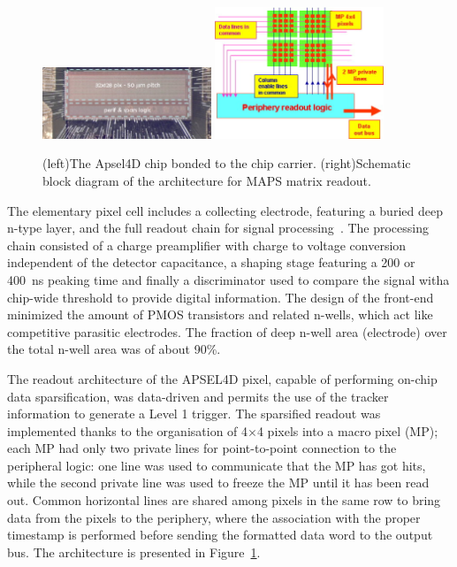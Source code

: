 \begin{figure}[!htpb]
\centering
\includegraphics[width=0.45\textwidth]{Apsel.jpg}
\includegraphics[width=0.45\textwidth]{Apselro.jpg}
\caption{\label{fig:apsel}(left)The Apsel4D chip bonded to the chip carrier. (right)Schematic block diagram of the architecture for MAPS matrix readout.}
\end{figure}

The elementary pixel cell includes a collecting electrode, featuring a buried deep n-type layer, and the full readout chain for signal processing~\cite{Ratti:2006zz}. The processing chain consisted of a charge 
preamplifier with charge to voltage conversion independent of the detector capacitance, a shaping 
stage featuring a 200 or 400~ns peaking time and finally a discriminator used to compare the signal witha chip-wide threshold to provide digital information. 
The design of the front-end minimized the amount of PMOS transistors and related n-wells, which act 
like competitive parasitic electrodes. The fraction of deep n-well area (electrode) over the total n-well 
area was of about 90\%. 



The readout architecture of the APSEL4D pixel, capable of performing on-chip data sparsification, was 
data-driven and permits the use of the tracker information to generate a Level 1 trigger. 
The sparsified readout was implemented thanks to the organisation of 4$\times$4 pixels into a macro 
pixel (MP); each MP had only two private lines for point-to-point connection to the peripheral logic:
one line was used to communicate that the MP has got hits, while the second private line was used to 
freeze the MP until it has been read out.  Common horizontal lines are shared among pixels in the 
same row to bring data from the pixels to the periphery, where the association with the proper 
timestamp is performed before sending the formatted data word to the output bus. The architecture is 
presented in Figure~\ref{fig:apsel}.

